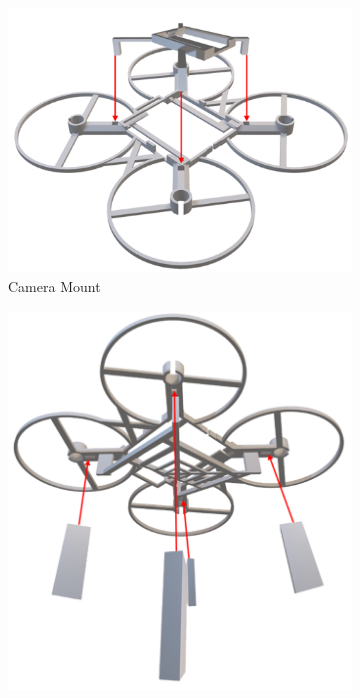 \begin{figure}[H]
    \centering
    \begin{subfigure}[b]{0.4\textwidth}
        \centering
        \includegraphics[width=\textwidth]{img/assembly-6.png}
        \caption{Camera Mount}
    \end{subfigure}
    \begin{subfigure}[b]{0.35\textwidth}
        \centering
        \includegraphics[width=\textwidth]{img/assembly-7.png}

\end{subfigure}
\end{figure}
